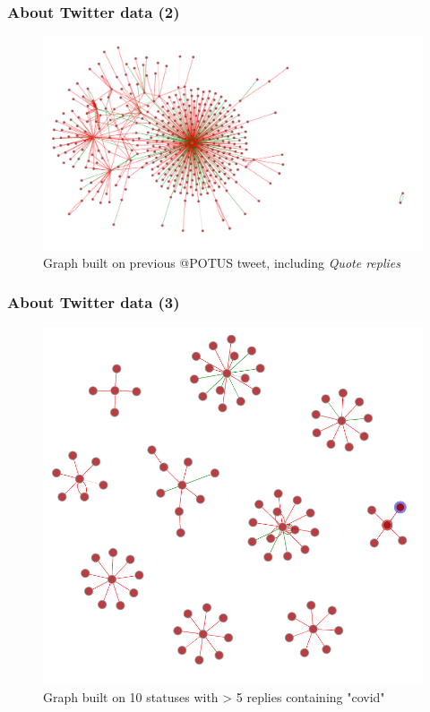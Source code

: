 \documentclass{beamer}
\begin{document}
\begin{frame}[c]
    \frametitle{About Twitter data (2)}
    \begin{figure}[h]
        \centering
        \includegraphics[width=1.1\linewidth]{img/potus_more.png}
        \caption{Graph built on previous @POTUS tweet, including \textit{Quote
        replies}}
        \label{fig:img/potus_more}
    \end{figure}
\end{frame}

\begin{frame}[c]
    \frametitle{About Twitter data (3)}
    \begin{figure}[h]
        \centering
        \includegraphics[width=0.7\linewidth]{img/reddit_covid_graph.png}
        \caption{Graph built on 10 statuses with > 5 replies containing "covid"}
        \label{fig:img/potus_more}
    \end{figure}
\end{frame}
\end{document}
